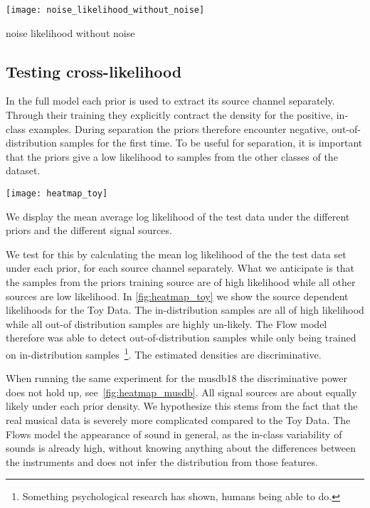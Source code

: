 \begin{marginfigure}
    \texttt{[image: noise\_likelihood\_without\_noise]}%
    \caption{noise likelihood without noise}%
    \label{fig:noise_ll_without_noise}
\end{marginfigure}

\subsection{Testing cross-likelihood}
In the full model each prior is used to extract its source channel separately. Through their training they explicitly contract the density for the positive, in-class examples. During separation the priors therefore encounter negative, out-of-distribution samples for the first time. To be useful for separation, it is important that the priors give a low likelihood to samples from the other classes of the dataset.

\begin{marginfigure}
    \texttt{[image: heatmap\_toy]}%
    \caption{We display the mean average log likelihood of the test data under the different priors and the different signal sources.}%
    \label{fig:heatmap_toy}
\end{marginfigure}

We test for this by calculating the mean log likelihood of the the test data set under each prior, for each source channel separately. What we anticipate is that the samples from the priors training source are of high likelihood while all other sources are low likelihood. In \cref{fig:heatmap_toy} we show the source dependent likelihoods for the Toy Data. The in-distribution samples are all of high likelihood while all out-of distribution samples are highly un-likely. The Flow model therefore was able to detect out-of-distribution samples while only being trained on in-distribution samples~\footnote{Something psychological research has shown, humans being able to do.}. The estimated densities are discriminative.

When running the same experiment for the musdb18 the discriminative power does not hold up, see~\cref{fig:heatmap_musdb}. All signal sources are about equally likely under each prior density. We hypothesize this stems from the fact that the real musical data is severely more complicated compared to the Toy Data. The Flows model the appearance of sound in general, as the in-class variability of sounds is already high, without knowing anything about the  differences between the instruments and does not infer the distribution from those features.

